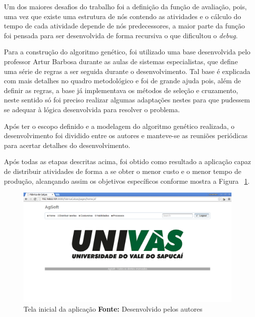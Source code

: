 \par Um dos maiores desafios do trabalho foi a definição da função de avaliação, pois, 
uma vez que existe uma estrutura de nós contendo as atividades e o cálculo do
tempo de cada atividade depende de nós predecessores, a maior parte da função foi 
pensada para ser desenvolvida de forma recursiva o que dificultou o
\textit{debug}.

\par Para a construção do algoritmo genético, foi utilizado uma base desenvolvida pelo professor Artur Barbosa 
durante as aulas de sistemas especialistas, que define uma série de regras a ser
seguida durante o desenvolvimento. Tal base é explicada com mais detalhes no
quadro metodológico e foi de grande ajuda pois, além de definir as
regras, a base já implementava os métodos de seleção e cruzamento, neste sentido
só foi preciso realizar algumas adaptações nestes para que pudessem se
adequar à lógica desenvolvida para resolver o problema.

\par Após ter o escopo definido e a modelagem do algoritmo genético realizada, o
desenvolvimento foi dividido entre os autores e manteve-se as reuniões
periódicas para acertar detalhes do desenvolvimento.

\par Após todas as etapas descritas acima, foi obtido como resultado a aplicação
capaz de distribuir atividades de forma a se obter o menor custo e o menor tempo de produção, 
alcançando assim os objetivos específicos conforme mostra a Figura
~\ref{fig:tela_inicial_da_aplicação}.

\begin{figure}[h!]
	\centerline{\includegraphics[scale=0.3]{./imagens/tela_inicial.png}}
	\caption[Tela inicial da aplicação]
	{Tela inicial da aplicação \textbf{Fonte:} Desenvolvido pelos autores}
	\label{fig:tela_inicial_da_aplicação}
\end{figure}


